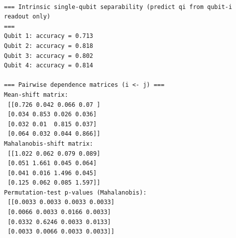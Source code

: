 \documentclass[11pt]{article}
\begin{document}
    \begin{Verbatim}[commandchars=\\\{\}]

=== Intrinsic single-qubit separability (predict qi from qubit-i readout only)
===
Qubit 1: accuracy = 0.713
Qubit 2: accuracy = 0.818
Qubit 3: accuracy = 0.802
Qubit 4: accuracy = 0.814

=== Pairwise dependence matrices (i <- j) ===
Mean-shift matrix:
 [[0.726 0.042 0.066 0.07 ]
 [0.034 0.853 0.026 0.036]
 [0.032 0.01  0.815 0.037]
 [0.064 0.032 0.044 0.866]]
Mahalanobis-shift matrix:
 [[1.022 0.062 0.079 0.089]
 [0.051 1.661 0.045 0.064]
 [0.041 0.016 1.496 0.045]
 [0.125 0.062 0.085 1.597]]
Permutation-test p-values (Mahalanobis):
 [[0.0033 0.0033 0.0033 0.0033]
 [0.0066 0.0033 0.0166 0.0033]
 [0.0332 0.6246 0.0033 0.0133]
 [0.0033 0.0066 0.0033 0.0033]]
    \end{Verbatim}


    
    
    
\end{document}
